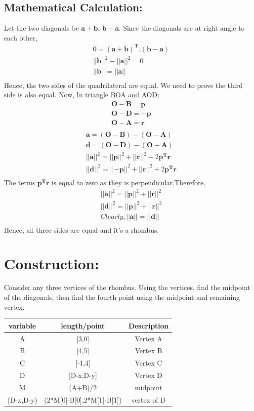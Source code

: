\documentclass[a4paper,12pt,twocolumn]{article}
\let\vec\mathbf
\begin{document}
\subsection{Mathematical Calculation:}
Let the two diagonals be $\vec{a+b}$, $\vec{b-a}$. Since the diagonals are at right angle to each other,
\begin{align}
&0 = \vec{(a+b)^T}.\vec{(b-a)}\\	
&||\vec{b}||^2 - ||\vec{a}||^2 = 0\\
&||\vec{b}|| = ||\vec{a}||\\
\end{align}
Hence, the two sides of the quadrilateral are equal. We need to prove the third side is also equal.
Now,
In triangle BOA and AOD;
\begin{align}
	&\vec{O-B} = \vec{p}\\
	&\vec{O-D} = \vec{-p}\\
	&\vec{O-A} = \vec{r}\\
\end{align}
\begin{align}
	&\vec{a} = \vec{(O-B)} - \vec{(O-A)}\\ 
	&\vec{d} = \vec{(O-D)} - \vec{(O-A)}\\
&||\vec{a}||^2 = ||\vec{p}||^2 + ||\vec{r}||^2 - 2\vec{p^Tr}\\
&||\vec{d}||^2 = ||\vec{-p}||^2 + ||\vec{r}||^2 + 2\vec{p^Tr}\\
\end{align}
The terms $\vec{p^Tr}$ is equal to zero as they is perpendicular.Therefore,
\begin{align}
	&||\vec{a}||^2 = ||\vec{p}||^2 + ||\vec{r}||^2\\
	&||\vec{d}||^2 = ||\vec{p}||^2 + ||\vec{r}||^2\\
	&Clearly, ||\vec{a}|| = ||\vec{d}||\\
\end{align}
Hence, all three sides are equal and it's a rhombus.
\section{Construction:}
Consider any  three vertices of the rhombus. Using the vertices, find the midpoint of the diagonals, then find the fourth point using the midpoint and remaining vertex. 
\begin{table}[h]
	\centering
\setlength\extrarowheight{2pt}
	\begin{tabular}{|c|c|c|}
		\hline
		\textbf{variable} & \textbf{length/point} & \textbf{Description}\\
		\hline
		A & [3,0] & Vertex A\\
		\hline
		B & [4,5] & Vertex B\\
		\hline
		C & [-1,4] & Vertex C\\
		\hline                   
		D & [D-x,D-y] & Vertex D\\
		\hline
		M & (A+B)/2 & midpoint\\
		\hline
		(D-x,D-y) & (2*M[0]-B[0],2*M[1]-B[1]) & vertex of D\\
		\hline
	\end{tabular}
\end{table}
\end{document}
